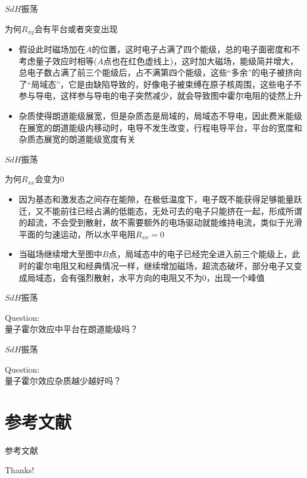 \documentclass{beamer}
\begin{document}
\begin{frame}{$SdH$振荡}
	\begin{block}{为何$R_{xy}$会有平台或者突变出现}
		\begin{itemize}
			\small 
			\item 假设此时磁场加在$A$的位置，这时电子占满了四个能级，总的电子面密度和不考虑量子效应时相等($A$点也在红色虚线上)，这时加大磁场，能级简并增大，总电子数占满了前三个能级后，占不满第四个能级，这些“多余”的电子被挤向了“局域态”，它是由缺陷导致的，好像电子被束缚在原子核周围，这些电子不参与导电，这样参与导电的电子突然减少，就会导致图中霍尔电阻的徒然上升
			\item 杂质使得朗道能级展宽，但是杂质态是局域的，局域态不导电，因此费米能级在展宽的朗道能级内移动时，电导不发生改变，行程电导平台，平台的宽度和杂质态展宽的朗道能级宽度有关
			
		\end{itemize}
	\end{block}
	
\end{frame}
\begin{frame}{$SdH$振荡}
	\begin{block}{为何$R_{xx}$会变为0}
		\begin{itemize}
			\item 因为基态和激发态之间存在能隙，在极低温度下，电子既不能获得足够能量跃迁，又不能前往已经占满的低能态，无处可去的电子只能挤在一起，形成所谓的超流，不会受到散射，故不需要额外的电场驱动就能维持电流，类似于光滑平面的匀速运动，所以水平电阻$R_{xx}=0$
			\item 当磁场继续增大至图中$B$点，局域态中的电子已经完全进入前三个能级上，此时的霍尔电阻又和经典情况一样，继续增加磁场，超流态破坏，部分电子又变成局域态，会有强烈散射，水平方向的电阻又不为0，出现一个峰值
		\end{itemize}
		
	\end{block}
\end{frame}
\begin{frame}{$SdH$振荡}
	\begin{center}
		{\huge\calligra Question:}\\
		量子霍尔效应中平台在朗道能级吗？
	\end{center}
\end{frame}
\begin{frame}{$SdH$振荡}
	\begin{center}
		{\huge\calligra Question:}\\
		量子霍尔效应杂质越少越好吗？
	\end{center}
\end{frame}
\section{参考文献}
\begin{frame}{参考文献}
	\printbibliography[heading = bibintoc]
\end{frame}
\begin{frame}
    \begin{center}
        {\Huge\calligra Thanks!}
    \end{center}
\end{frame}
\end{document}
